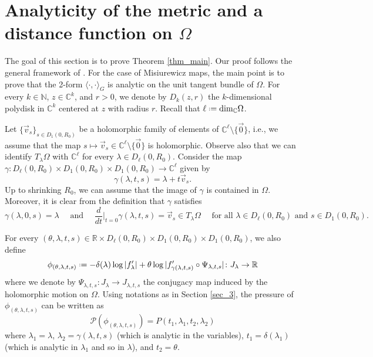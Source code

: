 \documentclass[11pt]{amsart}
\theoremstyle{plain}
\theoremstyle{definition}
\theoremstyle{remark}
\newcommand{\bbR}{\mathbb{R}} %
\newcommand*{\defeq}{\mathrel{\vcenter{\baselineskip0.5ex \lineskiplimit0pt
			\hbox{\scriptsize.}\hbox{\scriptsize.}}}%
	=}
\begin{document}
\section{Analyticity of the metric and a distance function on $\Omega$}\label{sec_5}
The goal of this section is to prove Theorem \ref{thm_main}. Our proof follows the general framework of \cite[Section 5]{BH24}. For the case of Misiurewicz maps, the main point is 
to prove that the 2-form $\langle \cdot, \cdot \rangle_G$ is analytic on the unit tangent bundle of $\Omega$. 
For every $k \in \mathbb N$, $z \in \mathbb C^k$,
and $r>0$, we denote by $D_{k}(z,r)$ the $k$-dimensional polydisk in $\mathbb{C}^k$ centered at $z$ with radius $r$. Recall that $\ell \defeq {\rm dim}_{\mathbb C}\Omega$.

\medskip

Let $\{\vec{v}_s\}_{s\in D_1(0,R_0)}$ be a holomorphic family of elements 
of
$ \mathbb{C}^\ell \setminus\{\vec{0}\}$, 
i.e., we assume that the map $s \mapsto 
\vec{v}_s\in \mathbb C^\ell \setminus\{\vec{0}\}$ is holomorphic.
Observe also that we can
identify $T_\lambda \Omega$ with 
$\mathbb C^\ell$ 
for every $\lambda \in D_\ell (0,R_0)$.
Consider the map $\gamma\colon D_{\ell}
(0,R_0)
\times D_1(0,R_0)\times D_1 (0,R_0)\to \mathbb C^\ell$ given by
\[
\gamma (\lambda, t,s ) = \lambda + t\vec{v}_s.
\]
Up to shrinking $R_0$, we can assume that the image of $\gamma$ is contained in $\Omega$. 
Moreover, it is clear from the definition that $\gamma$ satisfies
\[
\gamma(\lambda,0, s) = \lambda 
\quad \mbox{ and }
\quad
\frac{d}{dt}\Big|_{t=0}
\gamma (\lambda, t, s) = \vec{v}_s \in T_{\lambda}{\Omega}
\quad \mbox{ for all } \lambda \in D_\ell (0,R_0)
\mbox{ and }
s \in D_1 (0,R_0).
\]

For every $(\theta,\lambda, t,s) \in \bbR \times D_\ell(0,R_0)\times D_1(0,R_0)\times D_1(0,R_0)$, we also define
$$\phi_{(\theta,\lambda, t,s)} \defeq -\delta(\lambda)\log|f'_\lambda| + \theta\log |f'_{\gamma(\lambda, t,s)}\circ\Psi_{\lambda, t,s}| \colon J_\lambda \to \bbR$$
where we denote by $\Psi_{\lambda, t,s} \colon J_\lambda \to J_{\lambda,t,s}$ the conjugacy map induced by the holomorphic motion on $\Omega$. 
Using notations as in Section \ref{sec_3}, the pressure of $\phi_{(\theta,\lambda,t,s)}$ can be written as
\[\mathcal{P}(\phi_{(\theta, \lambda, t,s)})
= P (t_1,\lambda_1,t_2,\lambda_2)
\]
where  $\lambda_1 = \lambda$, $\lambda_2 = \gamma(\lambda, t,s)$
(which is analytic in the variables), 
$t_1 = \delta (\lambda_1)$
(which is analytic in $\lambda_1$ and so in $\lambda$),
and 
$t_2=\theta$.
\end{document}
